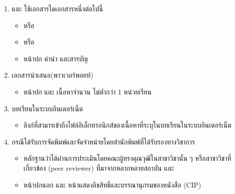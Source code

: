 \documentclass[a4paper,12pt,english]{sphinxmanual}
\begin{document}
\begin{enumerate}
%
\item {} 
{\hyperref[\detokenize{glossary:term-0}]{}} {\hyperref[\detokenize{glossary:term-1}]{}} {\hyperref[\detokenize{glossary:term-2}]{}} และ {\hyperref[\detokenize{glossary:term-3}]{}} ใช้เอกสารใดเอกสารหนึ่งต่อไปนี้
\begin{itemize}
\item {} 
{\hyperref[\detokenize{glossary:term-7}]{}}  หรือ

\item {} 
{\hyperref[\detokenize{glossary:term-8}]{}}  หรือ

\item {} 
หน้าปก คำนำ และสารบัญ

\end{itemize}

\item {} 
เอกสารนำเสนอ(พาวเวอร์พอยท์)
\begin{itemize}
\item {} 
หน้าปก และ เนื้อหาจำนวน ไม่ต่ำกว่า 1 หน่วยเรียน

\end{itemize}

\item {} 
บทเรียนในระบบอินเตอร์เน็ต
\begin{itemize}
\item {} 
ลิงก์ที่สามารเข้าถึงไฟล์อิเล็กทรอนิกส์ของเนื้อหาที่ระบุในบทเรียนในระบบอินเตอร์เน็ต

\end{itemize}

\item {} 
{\hyperref[\detokenize{glossary:term-2}]{}} กรณีได้รับการจัดพิมพ์และจัดจำหน่ายโดยสำนักพิมพ์ที่ได้รับรองทางวิชาการ
\begin{itemize}
\item {} 
หลักฐานว่าได้ผ่านการประเมินโดยคณะผู้ทรงคุณวุฒิในสาขาวิชานั้น ๆ หรือสาขาวิชาที่เกี่ยวข้อง (peer reviewer) ที่มาจากหลากหลายสถาบัน และ

\item {} 
หน้าปกนอก และ หน้าแสดงลิขสิทธิ์และบรรณานุกรมของหนังสือ (CIP)

\end{itemize}

\end{enumerate}
\end{document}

